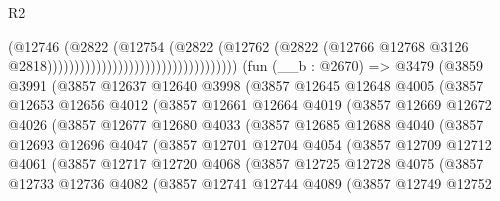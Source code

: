 \begin{lexlean}{R2}
\begin{coremodule}
                                                            (@12746
                                                              (@2822
                                                                (@12754
                                                                  (@2822
                                                                    (@12762
                                                                      (@2822
                                                                        (@12766
                                                                          @12768
                                                                          @3126
                                                                          @2818)))))))))))))))))))))))))))))))))))
    (fun (__b : @2670) =>
    @3479
      (@3859
        @3991
        (@3857
          @12637
          @12640
          @3998
          (@3857
            @12645
            @12648
            @4005
            (@3857
              @12653
              @12656
              @4012
              (@3857
                @12661
                @12664
                @4019
                (@3857
                  @12669
                  @12672
                  @4026
                  (@3857
                    @12677
                    @12680
                    @4033
                    (@3857
                      @12685
                      @12688
                      @4040
                      (@3857
                        @12693
                        @12696
                        @4047
                        (@3857
                          @12701
                          @12704
                          @4054
                          (@3857
                            @12709
                            @12712
                            @4061
                            (@3857
                              @12717
                              @12720
                              @4068
                              (@3857
                                @12725
                                @12728
                                @4075
                                (@3857
                                  @12733
                                  @12736
                                  @4082
                                  (@3857
                                    @12741
                                    @12744
                                    @4089
                                    (@3857
                                      @12749
                                      @12752

\end{coremodule}
\end{lexlean}
